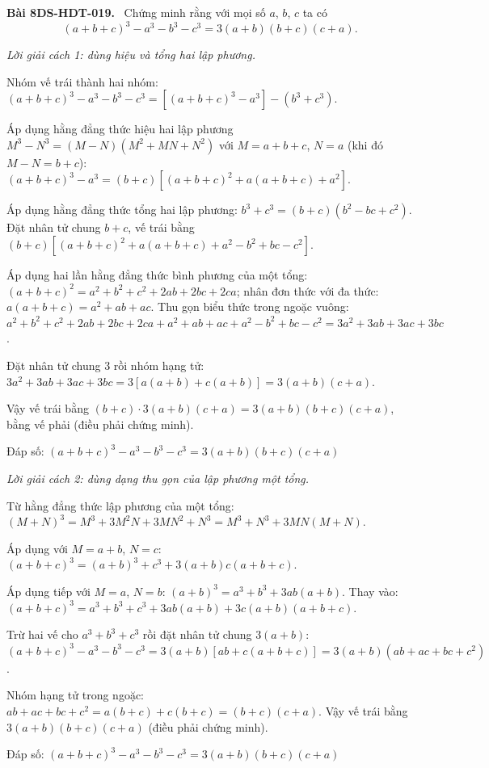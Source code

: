 \documentclass[12pt,a4paper]{article}
\newenvironment{problem}[1][]{\par\medskip\noindent\textbf{Bài #1.}\ }{\par}
\newenvironment{solution}[1][]{\par\noindent\textit{Lời giải #1.}\par}{\par}
\begin{document}
\begin{problem}[8DS-HDT-019]
Chứng minh rằng với mọi số $a$, $b$, $c$ ta có
\[ (a + b + c)^3 - a^3 - b^3 - c^3 = 3(a + b)(b + c)(c + a). \]

\begin{solution}[cách 1: dùng hiệu và tổng hai lập phương]
Nhóm vế trái thành hai nhóm: $(a + b + c)^3 - a^3 - b^3 - c^3 = \left[(a + b + c)^3 - a^3\right] - (b^3 + c^3)$.

Áp dụng hằng đẳng thức hiệu hai lập phương $M^3 - N^3 = (M - N)(M^2 + MN + N^2)$ với $M = a + b + c$, $N = a$ (khi đó $M - N = b + c$): $(a + b + c)^3 - a^3 = (b + c)\left[(a + b + c)^2 + a(a + b + c) + a^2\right]$.

Áp dụng hằng đẳng thức tổng hai lập phương: $b^3 + c^3 = (b + c)(b^2 - bc + c^2)$. Đặt nhân tử chung $b + c$, vế trái bằng $(b + c)\left[(a + b + c)^2 + a(a + b + c) + a^2 - b^2 + bc - c^2\right]$.

Áp dụng hai lần hằng đẳng thức bình phương của một tổng: $(a + b + c)^2 = a^2 + b^2 + c^2 + 2ab + 2bc + 2ca$; nhân đơn thức với đa thức: $a(a + b + c) = a^2 + ab + ac$. Thu gọn biểu thức trong ngoặc vuông: $a^2 + b^2 + c^2 + 2ab + 2bc + 2ca + a^2 + ab + ac + a^2 - b^2 + bc - c^2 = 3a^2 + 3ab + 3ac + 3bc$.

Đặt nhân tử chung $3$ rồi nhóm hạng tử: $3a^2 + 3ab + 3ac + 3bc = 3\left[a(a + b) + c(a + b)\right] = 3(a + b)(c + a)$.

Vậy vế trái bằng $(b + c) \cdot 3(a + b)(c + a) = 3(a + b)(b + c)(c + a)$, bằng vế phải (điều phải chứng minh).

Đáp số: $\boxed{(a + b + c)^3 - a^3 - b^3 - c^3 = 3(a + b)(b + c)(c + a)}$
\end{solution}

\begin{solution}[cách 2: dùng dạng thu gọn của lập phương một tổng]
Từ hằng đẳng thức lập phương của một tổng: $(M + N)^3 = M^3 + 3M^2N + 3MN^2 + N^3 = M^3 + N^3 + 3MN(M + N)$.

Áp dụng với $M = a + b$, $N = c$: $(a + b + c)^3 = (a + b)^3 + c^3 + 3(a + b)c(a + b + c)$.

Áp dụng tiếp với $M = a$, $N = b$: $(a + b)^3 = a^3 + b^3 + 3ab(a + b)$. Thay vào: $(a + b + c)^3 = a^3 + b^3 + c^3 + 3ab(a + b) + 3c(a + b)(a + b + c)$.

Trừ hai vế cho $a^3 + b^3 + c^3$ rồi đặt nhân tử chung $3(a + b)$: $(a + b + c)^3 - a^3 - b^3 - c^3 = 3(a + b)\left[ab + c(a + b + c)\right] = 3(a + b)(ab + ac + bc + c^2)$.

Nhóm hạng tử trong ngoặc: $ab + ac + bc + c^2 = a(b + c) + c(b + c) = (b + c)(c + a)$. Vậy vế trái bằng $3(a + b)(b + c)(c + a)$ (điều phải chứng minh).

Đáp số: $\boxed{(a + b + c)^3 - a^3 - b^3 - c^3 = 3(a + b)(b + c)(c + a)}$
\end{solution}
\end{problem}
\end{document}
